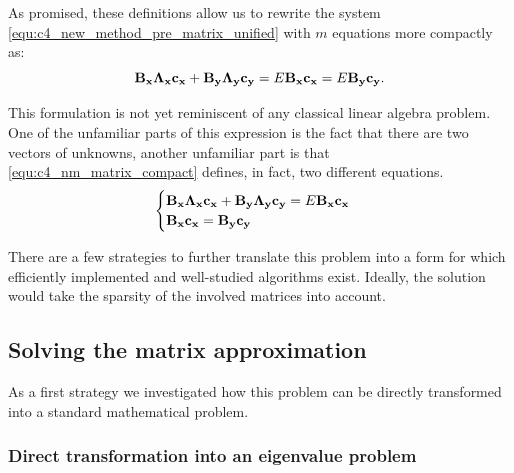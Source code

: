As promised, these definitions allow us to rewrite the system \eqref{equ:c4_new_method_pre_matrix_unified} with $m$ equations more compactly as:
\begin{equation}\label{equ:c4_nm_matrix_compact}
    \vb{B_x} \vb{\Lambda_x}\vb{c_x} + \vb{B_y} \vb{\Lambda_y}\vb{c_y} = E \vb{B_x} \vb{c_x} = E \vb{B_y} \vb{c_y}\text{.}
\end{equation}

This formulation is not yet reminiscent of any classical linear algebra problem. One of the unfamiliar parts of this expression is the fact that there are two vectors of unknowns, another unfamiliar part is that \eqref{equ:c4_nm_matrix_compact} defines, in fact, two different equations.
\begin{equation}
    \begin{cases}
        \vb{B_x} \vb{\Lambda_x}\vb{c_x} + \vb{B_y} \vb{\Lambda_y}\vb{c_y} = E \vb{B_x} \vb{c_x} \\
        \vb{B_x} \vb{c_x} = \vb{B_y} \vb{c_y}
    \end{cases} \label{equ:c4_new_method_first_matrix_problem}
\end{equation}

There are a few strategies to further translate this problem into a form for which efficiently implemented and well-studied algorithms exist. Ideally, the solution would take the sparsity of the involved matrices into account.

\subsection{Solving the matrix approximation}

As a first strategy we investigated how this problem can be directly transformed into a standard mathematical problem.

\subsubsection{Direct transformation into an eigenvalue problem}\label{sec:c4_nm_direct_transform}

